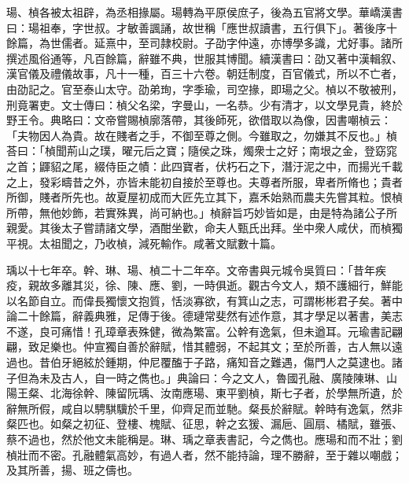 \begin{pinyinscope}
瑒、楨各被太祖辟，為丞相掾屬。瑒轉為平原侯庶子，後為五官將文學。華嶠漢書曰：瑒祖奉，字世叔。才敏善諷誦，故世稱「應世叔讀書，五行俱下」。著後序十餘篇，為世儒者。延熹中，至司隷校尉。子劭字仲遠，亦博學多識，尤好事。諸所撰述風俗通等，凡百餘篇，辭雖不典，世服其博聞。續漢書曰：劭又著中漢輯叙、漢官儀及禮儀故事，凡十一種，百三十六卷。朝廷制度，百官儀式，所以不亡者，由劭記之。官至泰山太守。劭弟珣，字季瑜，司空掾，即瑒之父。楨以不敬被刑，刑竟署吏。文士傳曰：楨父名梁，字曼山，一名恭。少有清才，以文學見貴，終於野王令。典略曰：文帝嘗賜楨廓落帶，其後師死，欲借取以為像，因書嘲楨云：「夫物因人為貴。故在賤者之手，不御至尊之側。今雖取之，勿嫌其不反也。」楨荅曰：「楨聞荊山之璞，曜元后之寶；隨侯之珠，燭衆士之好；南垠之金，登窈窕之首；鼲貂之尾，綴侍臣之幘：此四寶者，伏朽石之下，潛汙泥之中，而揚光千載之上，發彩疇昔之外，亦皆未能初自接於至尊也。夫尊者所服，卑者所脩也；貴者所御，賤者所先也。故夏屋初成而大匠先立其下，嘉禾始熟而農夫先嘗其粒。恨楨所帶，無他妙飾，若實殊異，尚可納也。」楨辭旨巧妙皆如是，由是特為諸公子所親愛。其後太子嘗請諸文學，酒酣坐歡，命夫人甄氏出拜。坐中衆人咸伏，而楨獨平視。太祖聞之，乃收楨，減死輸作。咸著文賦數十篇。

瑀以十七年卒。幹、琳、瑒、楨二十二年卒。文帝書與元城令吳質曰：「昔年疾疫，親故多離其災，徐、陳、應、劉，一時俱逝。觀古今文人，類不護細行，鮮能以名節自立。而偉長獨懷文抱質，恬淡寡欲，有箕山之志，可謂彬彬君子矣。著中論二十餘篇，辭義典雅，足傳于後。德璉常斐然有述作意，其才學足以著書，美志不遂，良可痛惜！孔璋章表殊健，微為繁富。公幹有逸氣，但未遒耳。元瑜書記翩翩，致足樂也。仲宣獨自善於辭賦，惜其體弱，不起其文；至於所善，古人無以遠過也。昔伯牙絕絃於鍾期，仲尼覆醢于子路，痛知音之難遇，傷門人之莫逮也。諸子但為未及古人，自一時之儁也。」典論曰：今之文人，魯國孔融、廣陵陳琳、山陽王粲、北海徐幹、陳留阮瑀、汝南應瑒、東平劉楨，斯七子者，於學無所遺，於辭無所假，咸自以騁騏驥於千里，仰齊足而並馳。粲長於辭賦。幹時有逸氣，然非粲匹也。如粲之初征、登樓、槐賦、征思，幹之玄猨、漏巵、圓扇、橘賦，雖張、蔡不過也，然於他文未能稱是。琳、瑀之章表書記，今之儁也。應瑒和而不壯；劉楨壯而不密。孔融體氣高妙，有過人者，然不能持論，理不勝辭，至于雜以嘲戲；及其所善，揚、班之儔也。


\end{pinyinscope}
